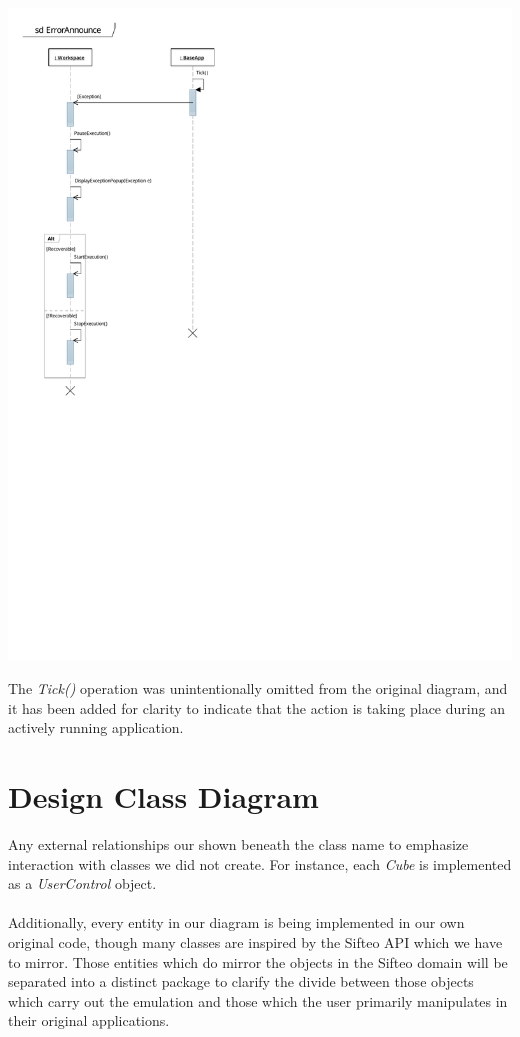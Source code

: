 \documentclass[12pt]{article}
\begin{document}
\begin{center}
        \includegraphics[scale=1]{./pdfs/MS4Models/ErrorAnnounce.pdf}
\end{center}
The \textit{Tick()} operation was unintentionally omitted from the original diagram, and it has been added for clarity to indicate that the action is taking place during an actively running application.

\section{Design Class Diagram}
Any external relationships our shown beneath the class name to emphasize interaction with classes we did not create. For instance, each \textit{Cube} is implemented as a \textit{UserControl} object.
\\\\
Additionally, every entity in our diagram is being implemented in our own original code, though many classes are inspired by the Sifteo API which we have to mirror. Those entities which do mirror the objects in the Sifteo domain will be separated into a distinct package to clarify the divide between those objects which carry out the emulation and those which the user primarily manipulates in their original applications.
\end{document}
